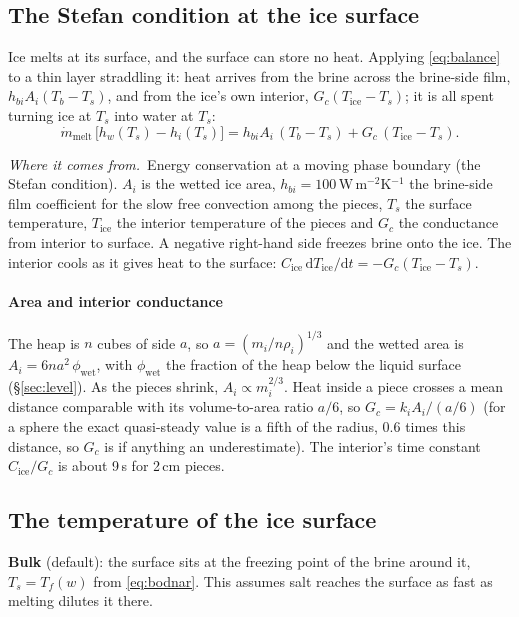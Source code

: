 \documentclass[11pt,a4paper]{article}
\newcommand{\where}{\par\noindent\textit{Where it comes from.}\ }
\begin{document}
\subsection{The Stefan condition at the ice surface}
\label{sec:stefan}
Ice melts at its surface, and the surface can store no heat. Applying \eqref{eq:balance} to a thin
layer straddling it: heat arrives from the brine across the brine-side film, $h_{bi}A_i(T_b - T_s)$,
and from the ice's own interior, $G_c(T_{\text{ice}} - T_s)$; it is all spent turning ice at $T_s$
into water at $T_s$:
\begin{equation}
\dot m_{\text{melt}}\,\big[h_w(T_s) - h_i(T_s)\big] = h_{bi}A_i\,(T_b - T_s) + G_c\,(T_{\text{ice}} - T_s).
\label{eq:stefan}
\end{equation}
\where Energy conservation at a moving phase boundary (the Stefan condition). $A_i$ is the wetted ice
area, $h_{bi} = 100$\,W\,m$^{-2}$K$^{-1}$ the brine-side film coefficient for the slow free convection
among the pieces, $T_s$ the surface temperature, $T_{\text{ice}}$ the interior temperature of the pieces
and $G_c$ the conductance from interior to surface. A negative right-hand side freezes brine onto the
ice. The interior cools as it gives heat to the surface:
$C_{\text{ice}}\,\mathrm dT_{\text{ice}}/\mathrm dt = -G_c(T_{\text{ice}} - T_s)$.

\paragraph{Area and interior conductance} The heap is $n$ cubes of side $a$, so
$a = (m_i/n\rho_i)^{1/3}$ and the wetted area is $A_i = 6na^2\,\phi_{\text{wet}}$, with
$\phi_{\text{wet}}$ the fraction of the heap below the liquid surface (§\ref{sec:level}). As the pieces
shrink, $A_i \propto m_i^{2/3}$. Heat inside a piece crosses a mean distance comparable with its
volume-to-area ratio $a/6$, so $G_c = k_i A_i/(a/6)$ (for a sphere the exact quasi-steady value is a
fifth of the radius, $0.6$ times this distance, so $G_c$ is if anything an underestimate). The
interior's time constant $C_{\text{ice}}/G_c$ is about 9\,s for 2\,cm pieces.

\subsection{The temperature of the ice surface}
\label{sec:surface}
\textbf{Bulk} (default): the surface sits at the freezing point of the brine around it,
$T_s = T_f(w)$ from \eqref{eq:bodnar}. This assumes salt reaches the surface as fast as melting
dilutes it there.
\end{document}
